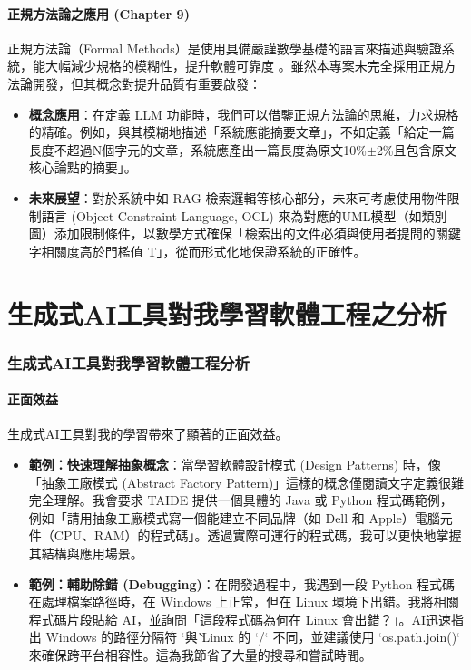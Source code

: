 \documentclass[twocolumn,11pt,a4paper]{article}
\begin{document}
\subsection{正規方法論之應用 (Chapter 9)}
正規方法論（Formal Methods）是使用具備嚴謹數學基礎的語言來描述與驗證系統，能大幅減少規格的模糊性，提升軟體可靠度 \cite{lee2024se}。雖然本專案未完全採用正規方法論開發，但其概念對提升品質有重要啟發：
\begin{itemize}
    \item \textbf{概念應用}：在定義 LLM 功能時，我們可以借鑒正規方法論的思維，力求規格的精確。例如，與其模糊地描述「系統應能摘要文章」，不如定義「給定一篇長度不超過N個字元的文章，系統應產出一篇長度為原文10\%$\pm$2\%且包含原文核心論點的摘要」。
    \item \textbf{未來展望}：對於系統中如 RAG 檢索邏輯等核心部分，未來可考慮使用物件限制語言 (Object Constraint Language, OCL) 來為對應的UML模型（如類別圖）添加限制條件，以數學方式確保「檢索出的文件必須與使用者提問的關鍵字相關度高於門檻值 T」，從而形式化地保證系統的正確性。
\end{itemize}


\part{生成式AI工具對我學習軟體工程之分析}

\section{生成式AI工具對我學習軟體工程分析}

\subsection{正面效益}
生成式AI工具對我的學習帶來了顯著的正面效益。
\begin{itemize}
    \item \textbf{範例：快速理解抽象概念}：當學習軟體設計模式 (Design Patterns) 時，像「抽象工廠模式 (Abstract Factory Pattern)」這樣的概念僅閱讀文字定義很難完全理解。我會要求 TAIDE 提供一個具體的 Java 或 Python 程式碼範例，例如「請用抽象工廠模式寫一個能建立不同品牌（如 Dell 和 Apple）電腦元件（CPU、RAM）的程式碼」。透過實際可運行的程式碼，我可以更快地掌握其結構與應用場景。
    \item \textbf{範例：輔助除錯 (Debugging)}：在開發過程中，我遇到一段 Python 程式碼在處理檔案路徑時，在 Windows 上正常，但在 Linux 環境下出錯。我將相關程式碼片段貼給 AI，並詢問「這段程式碼為何在 Linux 會出錯？」。AI迅速指出 Windows 的路徑分隔符 `\` 與 Linux 的 `/` 不同，並建議使用 `os.path.join()` 來確保跨平台相容性。這為我節省了大量的搜尋和嘗試時間。
\end{itemize}
\end{document}
